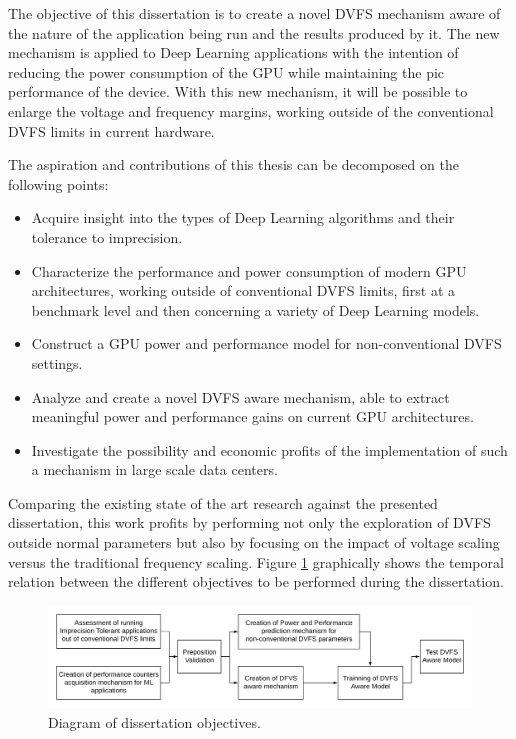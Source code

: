 The objective of this dissertation is to create a novel DVFS mechanism aware of the nature of the application being run and the results produced by it. The new mechanism is applied to Deep Learning applications with the intention of reducing the power consumption of the GPU while maintaining the pic performance of the device. With this new mechanism, it will be possible to enlarge the voltage and frequency margins, working outside of the conventional DVFS limits in current hardware. 


The aspiration and contributions of this thesis can be decomposed on the following points:
\begin{itemize}
\item Acquire insight into the types of Deep Learning algorithms and their tolerance to imprecision.
\item Characterize the performance and power consumption of modern GPU architectures, working outside of conventional DVFS limits, first at a benchmark level and then concerning a variety of Deep Learning models.
\item Construct a GPU power and performance model for non-conventional DVFS settings.
\item Analyze and create a novel DVFS aware mechanism, able to extract meaningful power and performance gains on current GPU architectures.
\item Investigate the possibility and economic profits of the implementation of such a mechanism in large scale data centers.
\end{itemize}

Comparing the existing state of the art research against the presented dissertation, this work profits by performing not only the exploration of DVFS outside normal parameters but also by focusing on the impact of voltage scaling versus the traditional frequency scaling.  Figure \ref{fig:thesisObj} graphically shows the temporal relation between the different objectives to be performed during the dissertation.


\begin{figure}[!htb]
  \centering
  \includegraphics[width=1\textwidth]{Figures/Introduction/Dissertation_Objectives.png}
  \caption{Diagram of dissertation objectives.}
  \label{fig:thesisObj}
\end{figure}

